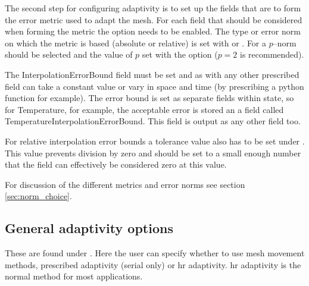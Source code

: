 The second step for configuring adaptivity is to set up the fields that are to form the error metric used
to adapt the mesh. For each field that should be considered when forming the metric the option
 needs to be enabled. The type or error norm on which the metric is based (absolute or relative) is set with  or . For a $p$--norm  should be selected and the value of $p$ set with the option  ($p=2$ is recommended).

The InterpolationErrorBound field must be set and as with any other prescribed field can take a constant value or vary in space and time (by prescribing a python function for example). The error bound is set as separate fields within
state, so for Temperature, for example, the acceptable error is stored an a field called
TemperatureInterpolationErrorBound. This field is output as any other field too.

For relative interpolation error bounds a tolerance value also has to be set under \newline
{}. This value prevents division by zero
and should be set to a small enough number that the field can effectively be considered zero at this value.

For discussion of the different metrics and error norms see section \ref{sec:norm_choice}.

\subsection{General adaptivity options}
\label{sec:configuring_fluidity_adaptivity_options}

These are found under . Here the user can specify whether to use mesh movement methods,
prescribed adaptivity (serial only) or hr adaptivity. hr adaptivity is the normal method for most applications.

